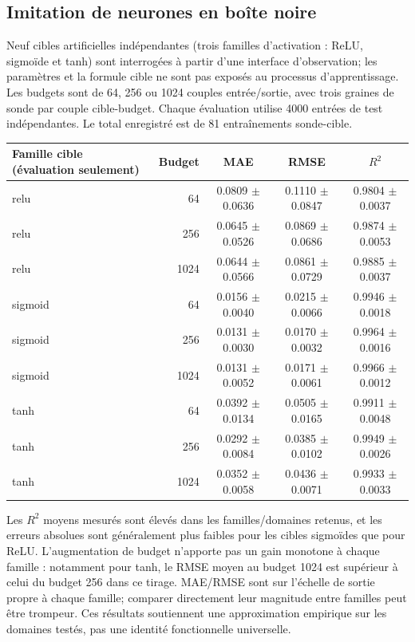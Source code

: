 \documentclass[11pt,a4paper]{article}
\begin{document}
\subsection{Imitation de neurones en boîte noire}
Neuf cibles artificielles indépendantes (trois familles d'activation : ReLU, sigmoïde et tanh) sont interrogées à partir d'une interface d'observation; les paramètres et la formule cible ne sont pas exposés au processus d'apprentissage. Les budgets sont de 64, 256 ou 1024 couples entrée/sortie, avec trois graines de sonde par couple cible-budget. Chaque évaluation utilise 4000 entrées de test indépendantes. Le total enregistré est de 81 entraînements sonde-cible.

\begin{center}\scriptsize
\begin{longtable}{l r c c c}
\toprule
\textbf{Famille cible (évaluation seulement)} & \textbf{Budget} & \textbf{MAE} & \textbf{RMSE} & \textbf{$R^2$}\\
\midrule\endhead
relu & 64 & 0.0809 $\pm$ 0.0636 & 0.1110 $\pm$ 0.0847 & 0.9804 $\pm$ 0.0037 \\
relu & 256 & 0.0645 $\pm$ 0.0526 & 0.0869 $\pm$ 0.0686 & 0.9874 $\pm$ 0.0053 \\
relu & 1024 & 0.0644 $\pm$ 0.0566 & 0.0861 $\pm$ 0.0729 & 0.9885 $\pm$ 0.0037 \\
sigmoid & 64 & 0.0156 $\pm$ 0.0040 & 0.0215 $\pm$ 0.0066 & 0.9946 $\pm$ 0.0018 \\
sigmoid & 256 & 0.0131 $\pm$ 0.0030 & 0.0170 $\pm$ 0.0032 & 0.9964 $\pm$ 0.0016 \\
sigmoid & 1024 & 0.0131 $\pm$ 0.0052 & 0.0171 $\pm$ 0.0061 & 0.9966 $\pm$ 0.0012 \\
tanh & 64 & 0.0392 $\pm$ 0.0134 & 0.0505 $\pm$ 0.0165 & 0.9911 $\pm$ 0.0048 \\
tanh & 256 & 0.0292 $\pm$ 0.0084 & 0.0385 $\pm$ 0.0102 & 0.9949 $\pm$ 0.0026 \\
tanh & 1024 & 0.0352 $\pm$ 0.0058 & 0.0436 $\pm$ 0.0071 & 0.9933 $\pm$ 0.0033 \\
\bottomrule
\end{longtable}
\end{center}

Les $R^2$ moyens mesurés sont élevés dans les familles/domaines retenus, et les erreurs absolues sont généralement plus faibles pour les cibles sigmoïdes que pour ReLU. L'augmentation de budget n'apporte pas un gain monotone à chaque famille : notamment pour tanh, le RMSE moyen au budget 1024 est supérieur à celui du budget 256 dans ce tirage. MAE/RMSE sont sur l'échelle de sortie propre à chaque famille; comparer directement leur magnitude entre familles peut être trompeur. Ces résultats soutiennent une approximation empirique sur les domaines testés, pas une identité fonctionnelle universelle.
\end{document}
